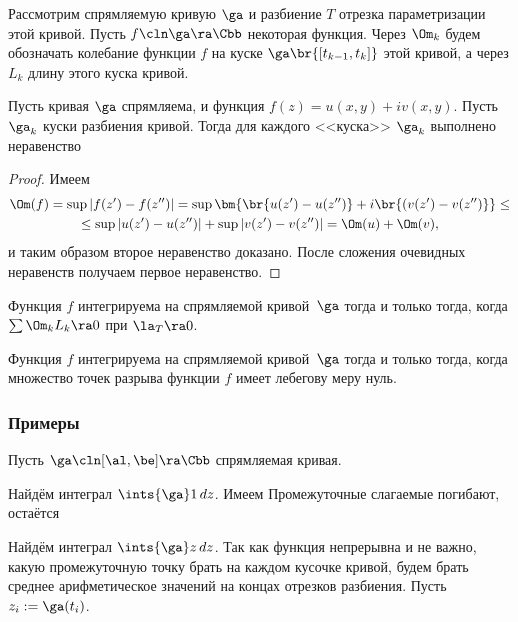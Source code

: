 \documentclass[a4paper]{article}
\begin{document}
\begin{solution}
Рассмотрим спрямляемую кривую $\ga$ и разбиение $T$ отрезка параметризации этой кривой.
Пусть $f\cln\ga\ra\Cbb$ некоторая функция. Через $\Om_k$ будем обозначать колебание функции $f$ на
куске $\ga\br{[t_{k-1},t_k]}$ этой кривой, а через $L_k$ длину этого куска кривой.

\begin{stm}
Пусть кривая $\ga$ спрямляема, и функция $f(z) = u(x,y)+iv(x,y)$. Пусть $\ga_k$ куски разбиения кривой.
Тогда для каждого <<куска>> $\ga_k$ выполнено неравенство
\end{stm}
\begin{proof}
Имеем
\begin{multline}
\Om(f) = \sup |f(z')-f(z'')| = \sup \bm{\br{u(z')- u(z'')}+i\br{(v(z')-v(z'')}} \le\\
\le \sup |u(z')-u(z'')| + \sup |v(z')-v(z'')| = \Om(u) + \Om(v),
\end{multline}
и таким образом второе неравенство доказано.
После сложения очевидных неравенств
получаем первое неравенство.
\end{proof}

\begin{theorem}
Функция $f$ интегрируема на спрямляемой кривой~$\ga$ тогда и только тогда, когда $\sum \Om_k L_k \ra 0$ при $\la_T\ra 0$.
\end{theorem}

\begin{theorem}
Функция $f$ интегрируема на спрямляемой кривой~$\ga$ тогда и только тогда, когда множество точек
разрыва функции $f$ имеет лебегову меру нуль.
\end{theorem}

\subsubsection{Примеры}

Пусть $\ga\cln[\al,\be]\ra\Cbb$ спрямляемая кривая.

\begin{ex}
Найдём интеграл $\ints{\ga}1\,dz$. Имеем
Промежуточные слагаемые погибают, остаётся
\end{ex}

\begin{ex}
Найдём интеграл $\ints{\ga}z\,dz$.
Так как функция непрерывна и не важно, какую промежуточную точку брать на каждом кусочке кривой, будем брать среднее
арифметическое значений на концах отрезков разбиения. Пусть $z_i := \ga(t_i)$.
\end{ex}


\end{solution}
\end{document}
